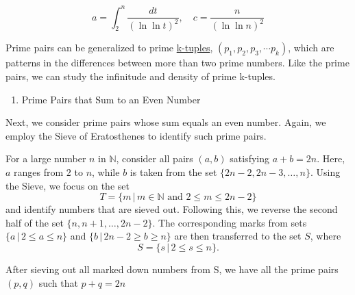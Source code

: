 \documentclass{article}
\begin{document}
\vspace{1\baselineskip}


\begin{equation}
a =  \int_{2}^{n} \frac{dt}{(\ln \ln t)^{2}}, \quad c = \frac{n}{(\ln \ln n)^{2}}
\end{equation}

\vspace{1\baselineskip}

Prime pairs can be generalized to prime \href{https://en.wikipedia.org/wiki/Prime_k-tuple}{k-tuples}, \( (p_{1},p_{2},p_{3},\cdots  p_{k})\), which are patterns in the differences between more than two prime numbers.
Like the prime pairs, we can study the infinitude and density of prime k-tuples.


\vspace{1\baselineskip}

\begin{enumerate}
\item 
\begin{center}
Prime Pairs that Sum to an Even Number 
\end{center}
\end{enumerate}

\vspace{1\baselineskip}

Next, we consider prime pairs whose sum equals an even number. Again, we employ the Sieve of Eratosthenes to identify such prime pairs.
\vspace{1\baselineskip}

For a large number \( n \) in \( \mathbb{N} \), consider all pairs \( (a,b) \) satisfying \( a+b = 2n \). Here, \( a \) ranges from \( 2 \) to \( n \), while \( b \) is taken from the set \( \{2n-2, 2n-3, \ldots, n\} \). Using the Sieve, we focus on the set 
\[ 
T = \{ m \,|\, m \in \mathbb{N} \text{ and } 2 \leq m \leq 2n-2 \}
\]
and identify numbers that are sieved out. Following this, we reverse the second half of the set \( \{ n, n+1, \ldots, 2n-2 \} \). The corresponding marks from sets \( \{ a \,|\, 2 \leq a \leq n \} \) and \( \{ b \,|\, 2n-2 \geq b \geq n \} \) are then transferred to the set \( S \), where 
\[ 
S = \{ s \,|\, 2 \leq s \leq n \}.
\]


\vspace{1\baselineskip}

After sieving out all marked down numbers from S, we have all the prime pairs \( (p,q)\) { }such that \( p+q = 2n\)

\vspace{1\baselineskip}
\end{document}
